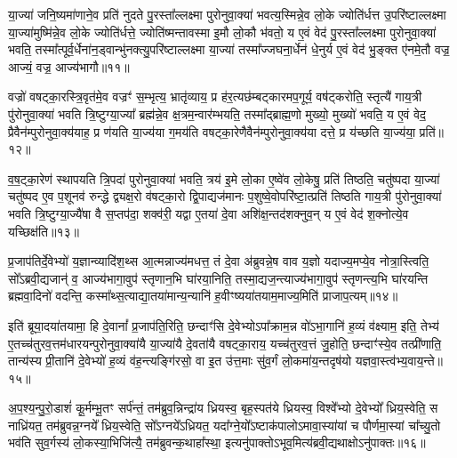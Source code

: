 या॒ज्या॑ जनि॒ष्यमा॑णाने॒व प्रति॑ नुदते पु॒रस्ता᳚ल्लक्ष्मा पुरोनुवा॒क्या॑ भवत्य॒स्मिन्ने॒व लो॒के ज्योति॑र्धत्त उ॒परि॑ष्टाल्लक्ष्मा या॒ज्या॑मुष्मि॑न्ने॒व लो॒के ज्योति॑र्धत्ते॒ ज्योति॑ष्मन्तावस्मा इ॒मौ लो॒कौ भ॑वतो॒ य ए॒वं वेद॑ पु॒रस्ता᳚ल्लक्ष्मा पुरोनुवा॒क्या॑ भवति॒ तस्मा᳚त्पूर्व॒र्धेना॑न॒ड्वान्भु॑नक्त्यु॒परि॑ष्टाल्लक्ष्मा या॒ज्या॑ तस्मा᳚ज्जघना॒र्धेन॑ धे॒नुर्य ए॒वं वेद॑ भु॒ङ्क्त ए॑नमे॒तौ वज्र॒ आज्यं॒ वज्र॒ आज्य॑भागौ॥११॥

वज्रो॑ वषट्का॒रस्त्रि॒वृत॑मे॒व वज्रꣳ॑ स॒म्भृत्य॒ भ्रातृ॑व्याय॒ प्र ह॑र॒त्यछ॑म्बट्कारमप॒गूर्य॒ वष॑ट्करोति॒ स्तृत्यै॑ गाय॒त्री पु॑रोनुवा॒क्या॑ भवति त्रि॒ष्टुग्या॒ज्या᳚ ब्रह्म॑न्ने॒व क्ष॒त्रम॒न्वार॑म्भयति॒ तस्मा᳚द्ब्राह्म॒णो मुख्यो॒ मुख्यो॑ भवति॒ य ए॒वं वेद॒ प्रैवैन॑म्पुरोनुवा॒क्य॑याह॒ प्र ण॑यति या॒ज्य॑या ग॒मय॑ति वषट्का॒रेणैवैन॑म्पुरोनुवा॒क्य॑या दत्ते॒ प्र य॑च्छति या॒ज्य॑या॒ प्रति॑॥१२॥

व॒ष॒ट्का॒रेण॑ स्थापयति त्रि॒पदा॑ पुरोनुवा॒क्या॑ भवति॒ त्रय॑ इ॒मे लो॒का ए॒ष्वे॑व लो॒केषु॒ प्रति॑ तिष्ठति॒ चतु॑ष्पदा या॒ज्या॑ चतु॑ष्पद ए॒व प॒शूनव॑ रुन्द्धे द्व्यक्ष॒रो व॑षट्का॒रो द्वि॒पाद्यज॑मानः प॒शुष्वे॒वोपरि॑ष्टा॒त्प्रति॑ तिष्ठति गाय॒त्री पु॑रोनुवा॒क्या॑ भवति त्रि॒ष्टुग्या॒ज्यै॑षा वै स॒प्तप॑दा॒ शक्व॑री॒ यद्वा ए॒तया॑ दे॒वा अशि॑क्ष॒न्तद॑शक्नुव॒न् य ए॒वं वेद॑ श॒क्नोत्ये॒व यच्छिक्ष॑ति॥१३॥

{\anuvakamend[{दे॒वता॑नाङ्करोत्यु॒परि॑ष्टाल्ल॒क्ष्मा\-ऽ\-ऽज्य॑भागौ॒ प्रति॑ श॒क्नोत्ये॒व द्वे च॑॥२॥}]}

प्र॒जाप॑तिर्दे॒वेभ्यो॑ य॒ज्ञान्व्यादि॑श॒थ्स आ॒त्मन्नाज्य॑मधत्त॒ तं दे॒वा अ॑ब्रुवन्ने॒ष वाव य॒ज्ञो यदाज्य॒मप्ये॒व नोत्रा॒स्त्विति॒ सो᳚\-ऽब्रवी॒द्यजान्॑ व॒ आज्य॑भागा॒वुप॑ स्तृणान॒भि घा॑रया॒निति॒ तस्मा॒द्यज॒न्त्याज्य॑भागा॒वुप॑ स्तृणन्त्य॒भि घा॑रयन्ति ब्रह्मवा॒दिनो॑ वदन्ति॒ कस्मा᳚थ्स॒त्याद्या॒तया॑मान्य॒न्यानि॑ ह॒वीꣳष्यया॑तयाम॒माज्य॒मिति॑ प्राजाप॒त्यम्॥१४॥

इति॑ ब्रूया॒दया॑तयामा॒ हि दे॒वानां᳚ प्र॒जाप॑ति॒रिति॒ छन्दाꣳ॑सि दे॒वेभ्यो\-ऽपा᳚क्राम॒न्न वो॑\-ऽभा॒गानि॑ ह॒व्यं व॑क्ष्याम॒ इति॒ तेभ्य॑ ए॒तच्च॑तुरव॒त्तम॑धारयन्पुरोनुवा॒क्या॑यै या॒ज्या॑यै दे॒वता॑यै वषट्का॒राय॒ यच्च॑तुरव॒त्तं जु॒होति॒ छन्दाꣳ॑स्ये॒व तत्प्री॑णाति॒ तान्य॑स्य प्री॒तानि॑ दे॒वेभ्यो॑ ह॒व्यं व॑ह॒न्त्यङ्गि॑रसो॒ वा इ॒त उ॑त्त॒माः सु॑व॒र्गं लो॒कमा॑य॒न्तदृष॑यो यज्ञवा॒स्त्व॑भ्य॒वाय॒न्ते॥१५॥

अ॒प॒श्य॒न्पु॒रो॒डाशं॑ कू॒र्मम्भू॒तꣳ सर्प॑न्तं॒ तम॑ब्रुव॒न्निन्द्रा॑य ध्रियस्व॒ बृह॒स्पत॑ये ध्रियस्व॒ विश्वे᳚भ्यो दे॒वेभ्यो᳚ ध्रिय॒स्वेति॒ स नाध्रि॑यत॒ तम॑ब्रुवन्न॒ग्नये᳚ ध्रिय॒स्वेति॒ सो᳚\-ऽग्नये᳚\-ऽध्रियत॒ यदा᳚ग्ने॒यो᳚\-ऽष्टाक॑पालो\-ऽमावा॒स्या॑यां च पौर्णमा॒स्यां चा᳚च्यु॒तो भव॑ति सुव॒र्गस्य॑ लो॒कस्या॒भिजि॑त्यै॒ तम॑ब्रुवन्क॒थाहा᳚स्था॒ इत्यनु॑पाक्तो\-ऽभूव॒मित्य॑ब्रवी॒द्यथाक्षो\-ऽनु॑पाक्तः॥१६॥

